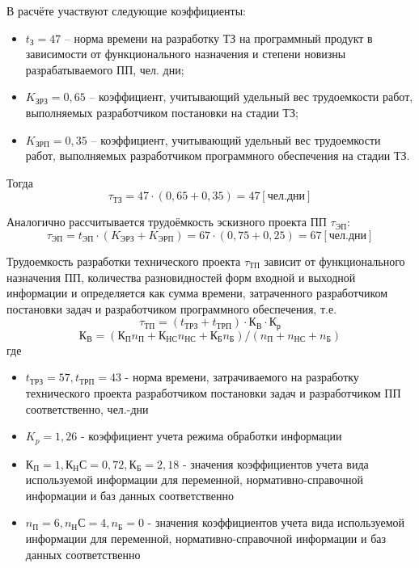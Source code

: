 В расчёте участвуют следующие коэффициенты:
\begin{itemize}
	\item $t_{З} = 47$ -- норма времени на разработку ТЗ на программный
		продукт в зависимости от функционального назначения и степени новизны
		разрабатываемого ПП, чел. дни;
	\item $K_{ЗРЗ} = 0,65$ -- коэффициент, учитывающий удельный вес
		трудоемкости работ, выполняемых разработчиком постановки на стадии ТЗ;
	\item $K_{ЗРП} = 0,35$ -- коэффициент, учитывающий удельный вес
		трудоемкости работ, выполняемых разработчиком программного обеспечения
		на стадии ТЗ.
\end{itemize}

Тогда
\begin{equation}
	\tau_{ТЗ} = 47 \cdot (0,65 + 0,35) = 47 [чел. дни]
\label{F:econ_3}
\end{equation}

Аналогично рассчитывается трудоёмкость эскизного проекта ПП $\tau_{ЭП}$:
\begin{equation}
	\tau_{ЭП} = t_{ЭП} \cdot (K_{ЭРЗ} + K_{ЭРП}) = 67 \cdot (0,75 + 0,25) = 67 [чел. дни]
\label{F:econ_4}
\end{equation}

Трудоемкость разработки технического проекта $\tau_{ТП}$ зависит от функционального
назначения ПП, количества разновидностей форм входной и выходной информации
и определяется как сумма времени, затраченного разработчиком постановки
задач и разработчиком программного обеспечения, т.е.
$$\tau_{ТП} = (t_{ТРЗ} + t_{ТРП}) \cdot К_{В} \cdot К_{р}$$
$$К_{В} = (К_{П} n_{П} + К_{НС} n_{НС} + К_{Б} n_{Б} )/(n_{П} + n_{НС} + n_{Б})$$
где
\begin{itemize}
	\item $t_{ТРЗ} = 57, t_{ТРП} = 43$ - норма времени, затрачиваемого на
		разработку технического проекта разработчиком постановки задач и
		разработчиком ПП соответственно, чел.-дни
	\item $K_{p} = 1,26$ - коэффициент учета режима обработки информации
	\item $К_{П} = 1, К_{Н}С = 0,72, К_{Б} = 2, 18$ - значения
		коэффициентов учета вида используемой информации для переменной,
		нормативно-справочной информации и баз данных соответственно
	\item $n_{П} = 6, n_{Н}С = 4, n_{Б} = 0$ - значения коэффициентов
		учета вида используемой информации для переменной,
		нормативно-справочной информации и баз данных соответственно
\end{itemize}

